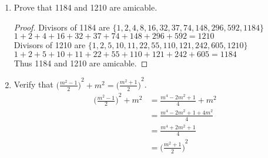 \documentclass[11pt]{article}
\begin{document}
\begin{enumerate}
\begin{proof}
        Hypothesis ($n=k$): \\
        Assume $t_k= \sum\limits_{i=1}^{k}i=1+2+\cdots+k=\displaystyle\frac{k(k+1)}{2}$ $\forall k \in \mathbb{Z}^{+}$ \\
        Induction ($n=k+1$): \\
        Consider $\sum\limits_{i=1}^{k+1}i$, then
        \begin{align*}
            \sum_{i=1}^{k+1}i &= 1+2+\cdots+k+(k+1) \\
            &= \frac{k(k+1)}{2} + (k+1) && \text{(Hypothesis)} \\
            &= \frac{k^2+k+2(k+1)}{2} \\
            &= \frac{k^2+3k+2}{2} \\
            &= \frac{(k+1)(k+2)}{2} = \frac{(k+1)((k+1)+1)}{2}
        \end{align*}
        \[\therefore t_n=\sum\limits_{i=1}^{n}i=\displaystyle\frac{n(n+1)}{2}\]
    \end{proof}
    \item Prove that 1184 and 1210 are amicable.
    \begin{proof}
    Divisors of 1184 are $\{1, 2, 4, 8, 16, 32, 37, 74,148, 296, 592, 1184\}$ \\
    $1+2+4+16+32+37+74+148+296+592=1210$ \\
    Divisors of 1210 are $\{1, 2, 5, 10, 11, 22, 55, 110, 121, 242, 605, 1210\}$ \\
    $1+2+5+10+11+22+55+110+121+242+605=1184$ \\
    Thus 1184 and 1210 are amicable.
    \end{proof}
    
    \item Verify that ${\bigg(\frac{m^2-1}{2}\bigg)}^2+m^2={\bigg(\frac{m^2+1}{2}\bigg)}^2$.
    \begin{align*}
        {\Bigg(\frac{m^2-1}{2}\Bigg)}^2+m^2 &= \frac{m^4-2m^2+1}{4}+m^2 \\
        &= \frac{m^4-2m^2+1+4m^2}{4} \\
        &= \frac{m^4+2m^2+1}{4} \\
        &= {\Bigg(\frac{m^2+1}{2}\Bigg)}^2
    \end{align*}
\end{enumerate}
\end{document}

